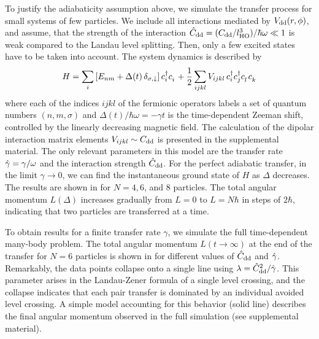 To justify the adiabaticity assumption above, we simulate the transfer process for small systems of few particles. We include all interactions mediated by $V_\text{dd}(r,\phi)$, and assume, that the strength of the interaction ${\hat C}_\text{dd}=(C_\text{dd}/l_\text{HO}^3)/\hbar\omega \ll 1$ is weak compared to the Landau level splitting. Then, only a few excited states have to be taken into account.
The system dynamics is described by
\begin{align*}
H=\sum_{i} \left[ E_{nm}  + \Delta(t)\,\delta_{\sigma,\down} \right] {c}^\dagger_{i}{c}^{\phantom\dagger}_{i} +  \frac{1}{2}\sum_{ijkl} V_{ijkl}\, {c}^\dagger_{i} {c}^\dagger_{j} {c}^{\phantom\dagger}_{l}{c}^{\phantom\dagger}_{k}
\end{align*}
where each of the indices $ijkl$ of the fermionic operators labels a set of quantum numbers $(n,m,\sigma)$ and $\Delta(t)/\hbar\omega = -\gamma t$ is the time-dependent Zeeman shift, controlled by the linearly decreasing magnetic field. The calculation of the dipolar interaction matrix elements $V_{ijkl}\sim C_\text{dd}$ is presented in the supplemental material. The only relevant parameters in this model are the transfer rate  ${\hat \gamma}=\gamma/\omega$ and the interaction strength ${\hat C}_\text{dd}$.
For the perfect adiabatic transfer, in the limit $\gamma\rightarrow 0$, we can find the instantaneous ground state of $H$ as $\Delta$ decreases. The results are shown in  for $N=4,6$, and $8$ particles. The total angular momentum $L(\Delta)$ increases gradually from $L=0$ to $L=N\hbar$ in steps of $2\hbar$, indicating that two particles are transferred at a time.

To obtain results for a finite transfer rate $\gamma$, we simulate the full time-dependent many-body problem.
The total angular momentum $L(t\rightarrow\infty)$ at the end of the transfer for $N=6$ particles is shown in  for different values of ${\hat C}_\text{dd}$ and ${\hat \gamma}$.  Remarkably, the data points collapse onto a single line using  $\lambda = {\hat C}_\text{dd}^2/{\hat \gamma}$. This parameter arises in the Landau-Zener formula of a single level crossing, and the collapse indicates that
each pair transfer is dominated by an individual avoided level crossing. A simple model accounting for this behavior (solid line) describes the final angular momentum observed in the full simulation (see supplemental material).

